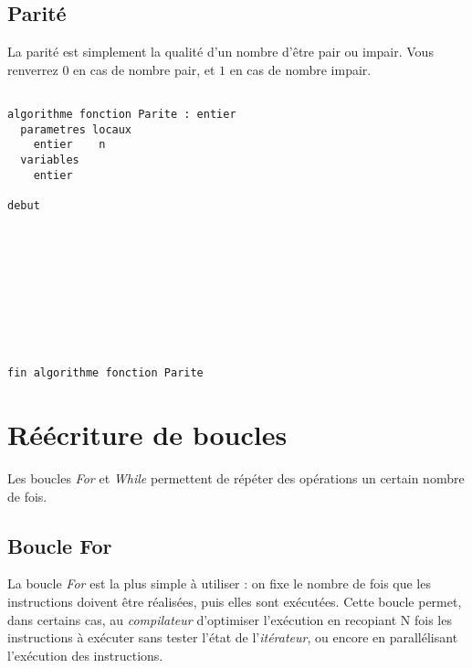 \documentclass[11pt,a4paper]{article}
\begin{document}
\vfillLast


\clearpage


\subsection{Parité}

\vfillFirst


La parité est simplement la qualité d'un nombre d'être pair ou impair.
Vous renverrez $ 0 $ en cas de nombre pair, et $ 1 $ en cas de nombre impair.

\bigskip


\begin{center}

\begin{lstlisting}[style=algorithmique]

algorithme fonction Parite : entier
  parametres locaux
    entier    n
  variables
    entier

debut










fin algorithme fonction Parite
\end{lstlisting}

\end{center}

\vfillLast

\clearpage


\section{Réécriture de boucles}

\bigskip

Les boucles \textit{For} et \textit{While} permettent de répéter des opérations un certain nombre de fois.

\vspace*{1cm}

\subsection{Boucle For}

La boucle \textit{For} est la plus simple à utiliser : on fixe le nombre de fois que les instructions doivent être réalisées, puis elles sont exécutées.
Cette boucle permet, dans certains cas, au \textit{compilateur} d'optimiser l'exécution en recopiant N fois les instructions à exécuter sans tester l'état de l'\textit{itérateur}, ou encore en parallélisant l'exécution des instructions.
\end{document}
